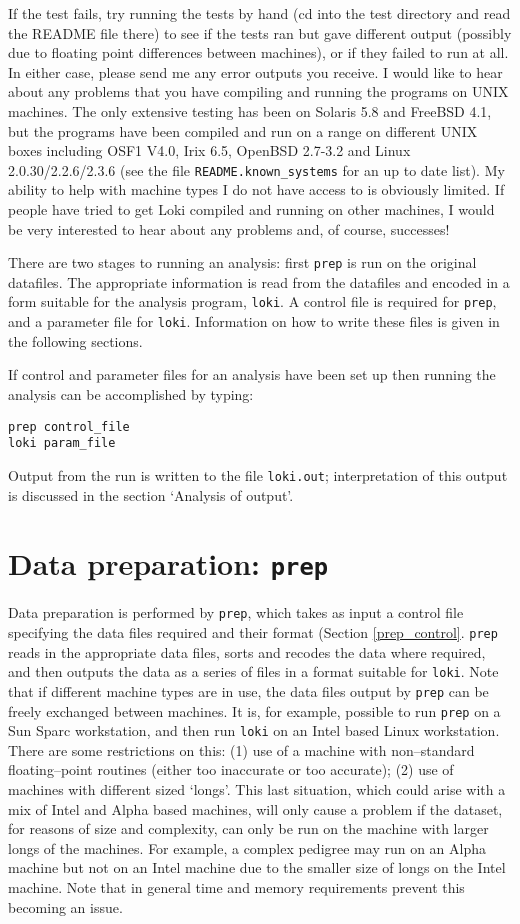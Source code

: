 \documentclass[10pt,a4paper]{article}
\newcommand{\Prep}{\texttt{prep}\xspace}
\newcommand{\Loki}{\texttt{loki}\xspace}
\begin{document}
If the test fails, try running the tests by hand (cd into the test directory
and read the README file there) to see if the tests ran but gave different
output (possibly due to floating point differences between machines), or if
they failed to run at all.  In either case, please send me any error outputs
you receive.  I would like to hear about any problems that you have
compiling and running the programs on UNIX machines.  The only extensive
testing has been on Solaris 5.8 and FreeBSD 4.1, but the programs have been
compiled and run on a range on different UNIX boxes including OSF1 V4.0,
Irix 6.5, OpenBSD 2.7-3.2 and Linux 2.0.30/2.2.6/2.3.6 (see the file
\verb+README.known_systems+ for an up to date list).  My ability to help with
machine types I do not have access to is obviously limited. If people have
tried to get Loki compiled and running on other machines, I would be very
interested to hear about any problems and, of course, successes!

There are two stages to running an analysis: first \Prep is run on the original
datafiles.  The appropriate information is read from the datafiles and encoded
in a form suitable for the analysis program, \Loki.  A control file is required
for \Prep, and a parameter file for \Loki.  Information on how to write these
files is given in the following sections.

If control and parameter files for an analysis have been set up then running
the analysis can be accomplished by typing:
\begin{verbatim}
prep control_file
loki param_file
\end{verbatim}
Output from the run is written to the file \verb+loki.out+; interpretation of
this output is discussed in the section `Analysis of output'.
\section{Data preparation: \Prep}
Data preparation is performed by \Prep, which takes as input a control file
specifying the data files required and their format (Section
\ref{prep_control}.  \Prep reads in the appropriate data files, sorts and
recodes the data where required, and then outputs the data as a series of
files in a format suitable for \Loki.  Note that if different machine types
are in use, the data files output by \Prep can be freely exchanged between
machines.  It is, for example, possible to run \Prep on a Sun Sparc
workstation, and then run \Loki on an Intel based Linux workstation. There
are some restrictions on this: (1) use of a machine with non--standard
floating--point routines (either too inaccurate or too accurate); (2) use of
machines with different sized `longs'.  This last situation, which could
arise with a mix of Intel and Alpha based machines, will only cause a
problem if the dataset, for reasons of size and complexity, can only be run
on the machine with larger longs of the machines.  For example, a complex
pedigree may run on an Alpha machine but not on an Intel machine due to the
smaller size of longs on the Intel machine.  Note that in general time and
memory requirements prevent this becoming an issue.
\end{document}
